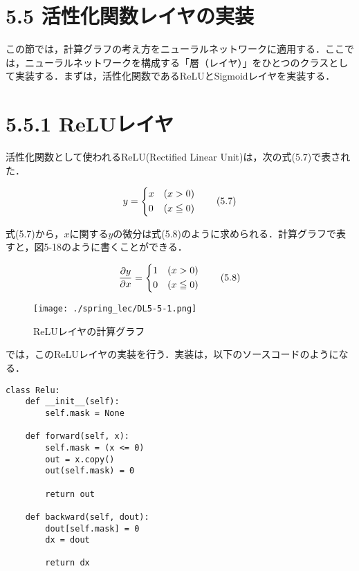\documentclass[dvipdfmx]{jsarticle}
\begin{document}
\section*{5.5 活性化関数レイヤの実装}
この節では，計算グラフの考え方をニューラルネットワークに適用する．ここでは，ニューラルネットワークを構成する「層（レイヤ）」をひとつのクラスとして実装する．まずは，活性化関数であるReLUとSigmoidレイヤを実装する．

\section*{5.5.1 ReLUレイヤ}
活性化関数として使われるReLU(Rectified Linear Unit)は，次の式(5.7)で表された．

\begin{equation}
y =
\begin{dcases}
x & (x > 0) \\
0 & (x \leqq 0)
\end{dcases}
\tag{5.7}
\end{equation}

式(5.7)から，$x$に関する$y$の微分は式(5.8)のように求められる．計算グラフで表すと，図5-18のように書くことができる．

\begin{equation}
    \frac{\partial y}{\partial x} =
    \begin{dcases}
    1 & (x > 0) \\
    0 & (x \leqq 0)
    \end{dcases}
\tag{5.8}
\end{equation}

\begin{figure}[htbp]
\begin{center}
\texttt{[image: ./spring\_lec/DL5-5-1.png]}
\end{center}
\caption{ReLUレイヤの計算グラフ}
\end{figure}

では，このReLUレイヤの実装を行う．実装は，以下のソースコードのようになる．

\begin{lstlisting}[caption=ReLU,label=fuga]
class Relu:
    def __init__(self):
        self.mask = None

    def forward(self, x):
        self.mask = (x <= 0)
        out = x.copy()
        out(self.mask) = 0

        return out
    
    def backward(self, dout):
        dout[self.mask] = 0
        dx = dout

        return dx
\end{lstlisting}
\end{document}
